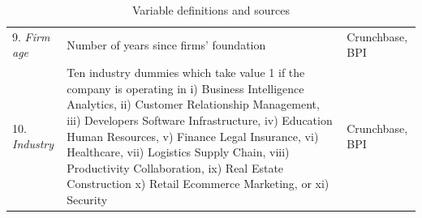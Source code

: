 \documentclass[12pt]{article}
\begin{document}
\begin{table} [ht]
\begin{tabularx}{\textwidth}{ p{5cm} p{7cm} p{2.2cm} }
9. \textit{Firm age} & Number of years since firms' foundation & Crunchbase, BPI\\
10. \textit{Industry} & Ten industry dummies which take value 1 if the company is operating in i) Business Intelligence Analytics, ii) Customer Relationship Management, iii) Developers Software Infrastructure, iv) Education Human Resources, v) Finance Legal Insurance, vi) Healthcare, vii) Logistics Supply Chain, viii) Productivity Collaboration, ix) Real Estate Construction x) Retail Ecommerce Marketing, or xi) Security & Crunchbase, BPI \\
\cmidrule(r){1-3}
\end{tabularx}
\caption{Variable definitions and sources}
\label{table1}
\end{table}

\end{document}

